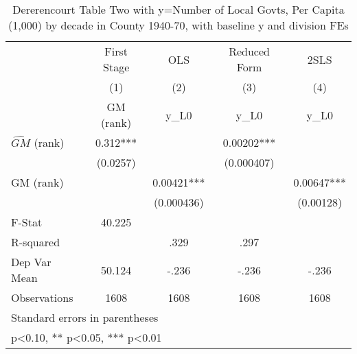 \begin{table}[htbp]\centering
\def\sym#1{\ifmmode^{#1}\else\(^{#1}\)\fi}
\caption{Dererencourt Table Two with y=Number of Local Govts, Per Capita (1,000) by decade in County 1940-70, with baseline y and division FEs}
\begin{tabular}{l*{4}{c}}
\toprule
                    & First Stage   &         OLS   &Reduced Form   &        2SLS   \\
                    &\multicolumn{1}{c}{(1)}&\multicolumn{1}{c}{(2)}&\multicolumn{1}{c}{(3)}&\multicolumn{1}{c}{(4)}\\
                    &\multicolumn{1}{c}{GM  (rank)}&\multicolumn{1}{c}{y\_L0}&\multicolumn{1}{c}{y\_L0}&\multicolumn{1}{c}{y\_L0}\\
\midrule
$\hat{GM}$ (rank)   &       0.312***&               &     0.00202***&               \\
                    &    (0.0257)   &               &  (0.000407)   &               \\
\addlinespace
GM  (rank)          &               &     0.00421***&               &     0.00647***\\
                    &               &  (0.000436)   &               &   (0.00128)   \\
\midrule
F-Stat              &      40.225   &               &               &               \\
R-squared           &               &        .329   &        .297   &               \\
Dep Var Mean        &      50.124   &       -.236   &       -.236   &       -.236   \\
Observations        &        1608   &        1608   &        1608   &        1608   \\
\bottomrule
\multicolumn{5}{l}{\footnotesize Standard errors in parentheses}\\
\multicolumn{5}{l}{\footnotesize * p<0.10, ** p<0.05, *** p<0.01}\\
\end{tabular}
\end{table}
